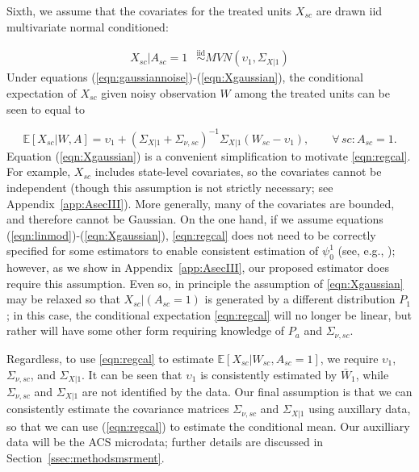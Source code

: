 \documentclass[aoas]{imsart}
\theoremstyle{plain}
\theoremstyle{remark}
\begin{document}
Sixth, we assume that the covariates for the treated units $X_{sc}$ are drawn iid multivariate normal conditioned:

\begin{align} \label{eqn:Xgaussian}
    X_{sc}|A_{sc} = 1 & \stackrel{\text{iid}}{\sim} MVN(\upsilon_1, \Sigma_{X|1})%
\end{align}
%
Under equations (\ref{eqn:gaussiannoise})-(\ref{eqn:Xgaussian}), the conditional expectation of $X_{sc}$ given noisy observation $W$ among the treated units can be seen to equal to

\begin{equation} \label{eqn:regcal}
\mathbb{E}[X_{sc}| W, A] = \upsilon_1 + \left(\Sigma_{X|1} + \Sigma_{\nu, sc}\right)^{-1} \Sigma_{X|1} (W_{sc} - \upsilon_1), \qquad \forall\, sc: A_{sc} = 1.
\end{equation}
%
Equation (\ref{eqn:Xgaussian}) is a convenient simplification to motivate \eqref{eqn:regcal}. For example, $X_{sc}$ includes state-level covariates, so the covariates cannot be independent (though this assumption is not strictly necessary; see Appendix~\ref{app:AsecIII}). More generally, many of the covariates are bounded, and therefore cannot be Gaussian. On the one hand, if we assume equations (\ref{eqn:linmod})-(\ref{eqn:Xgaussian}), \eqref{eqn:regcal} does not need to be correctly specified for some estimators to enable consistent estimation of $\psi_0^1$ (see, e.g., \cite{gleser1992importance}); however, as we show in Appendix~\ref{app:AsecIII}, our proposed estimator does require this assumption. Even so, in principle the assumption of \eqref{eqn:Xgaussian} may be relaxed so that $X_{sc}|(A_{sc}=1)$ is generated by a different distribution $P_1$; in this case, the conditional expectation \eqref{eqn:regcal} will no longer be linear, but rather will have some other form requiring knowledge of $P_a$ and $\Sigma_{\nu, sc}$.

Regardless, to use \eqref{eqn:regcal} to estimate $\mathbb{E}[X_{sc}|W_{sc}, A_{sc}=1]$, we require $\upsilon_1$, $\Sigma_{\nu,sc}$, and $\Sigma_{X|1}$. It can be seen that $\upsilon_1$ is consistently estimated by $\bar{W}_1$, while $\Sigma_{\nu,sc}$ and $\Sigma_{X|1}$ are not identified by the data. Our final assumption is that we can consistently estimate the covariance matrices $\Sigma_{\nu,sc}$ and $\Sigma_{X|1}$ using auxillary data, so that we can use (\ref{eqn:regcal}) to estimate the conditional mean. Our auxilliary data will be the ACS microdata; further details are discussed in Section~\ref{ssec:methodsmsrment}.
\end{document}
